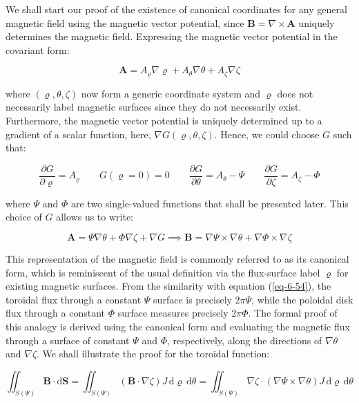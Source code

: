 We shall start our proof of the existence of canonical coordinates for any general magnetic field using the magnetic vector potential, since $\mathbf{B}=\nabla\times\mathbf{A}$ uniquely determines the magnetic field. Expressing the magnetic vector potential in the covariant form:

\begin{equation}
    \mathbf{A}=A_\varrho\nabla\varrho+A_\theta\nabla\theta+A_\zeta\nabla\zeta
\end{equation}

where $(\varrho,\theta,\zeta)$ now form a generic coordinate system and $\varrho$ does not necessarily label magnetic surfaces since they do not necessarily exist. Furthermore, the magnetic vector potential is uniquely determined up to a gradient of a scalar function, here, $\nabla G(\varrho,\theta,\zeta)$. Hence, we could choose $G$ such that:

\begin{equation}
    \frac{\partial G}{\partial\varrho}=A_\varrho\qquad G(\varrho=0)=0\qquad\frac{\partial G}{\partial\theta}=A_\theta-\Psi\qquad\frac{\partial G}{\partial\zeta}=A_\zeta-\Phi
\end{equation}

where $\Psi$ and $\Phi$ are two single-valued functions that shall be presented later. This choice of $G$ allows us to write:

\begin{equation}
    \label{eq-5-152}
    \mathbf{A}=\Psi\nabla\theta+\Phi\nabla\zeta+\nabla G\implies\mathbf{B}=\nabla\Psi\times\nabla\theta+\nabla\Phi\times\nabla\zeta
\end{equation}

This representation of the magnetic field is commonly referred to as its canonical form, which is reminiscent of the usual definition via the flux-surface label $\varrho$ for existing magnetic surfaces. From the similarity with equation (\ref{eq-6-54}), the toroidal flux through a constant $\Psi$ surface is precisely $2\pi\Psi$, while the poloidal disk flux through a constant $\Phi$ surface measures precisely $2\pi\Phi$. The formal proof of this analogy is derived using the canonical form and evaluating the magnetic flux through a surface of constant $\Psi$ and $\Phi$, respectively, along the directions of $\nabla\theta$ and $\nabla\zeta$. We shall illustrate the proof for the toroidal function:

\begin{equation}
    \iint_{S(\Psi)}\mathbf{B}\cdot\mathrm{d}\mathbf{S}=\iint_{S(\Psi)}(\mathbf{B}\cdot\nabla\zeta)J\,\mathrm{d}\varrho\,\mathrm{d}\theta=\iint_{S(\Psi)}\nabla\zeta\cdot(\nabla\Psi\times\nabla\theta)J\,\mathrm{d}\varrho\,\mathrm{d}\theta
\end{equation}


